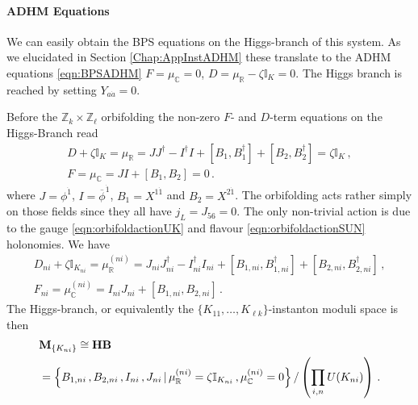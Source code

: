 \documentclass[main.tex]{subfiles}
\begin{document}
\paragraph{ADHM Equations}
We can easily obtain the BPS equations on the Higgs-branch of this system. As we elucidated in Section \ref{Chap:AppInstADHM} these translate to the ADHM equations \eqref{eqn:BPSADHM} $F=\mu_{\mathbb{C}}=0$, $D=\mu_{\mathbb{R}}-\zeta\mathbb{I}_K=0$. The Higgs branch is reached by setting $Y_{a\dot a}=0$.

Before the $\mathbb{Z}_k\times\mathbb{Z}_{\ell}$ orbifolding the non-zero $F$- and $D$-term equations on the Higgs-Branch read
\begin{gather}
D+\zeta\mathbb{I}_K=\mu_{\mathbb{R}}=JJ^{\dagger}-I^{\dagger}I+[B_1,B_1^{\dagger}]+[B_2,B_2^{\dagger}]=\zeta\mathbb{I}_{K}\,,\\
F=\mu_{\mathbb{C}}=JI+[B_1,B_2]=0\,.
\end{gather}
where $J=\phi^{\dot1}$, $I=\overline{\phi}^{\dot1}$, $B_1=X^{1\dot1}$ and $B_2=X^{2\dot1}$. The orbifolding acts rather simply on those fields since they all have $j_L=J_{56}=0$. The only non-trivial action is due to the gauge \eqref{eqn:orbifoldactionUK} and flavour \eqref{eqn:orbifoldactionSUN} holonomies. We have
\begin{gather}
D_{ni}+\zeta\mathbb{I}_{K_{ni}}=\mu^{(ni)}_{\mathbb{R}}=J_{ni}J^{\dagger}_{ni}-I^{\dagger}_{ni}I_{ni}+[B_{1,ni},B^{\dagger}_{1,ni}]+[B_{2,ni},B^{\dagger}_{2,ni}]\,,\\
F_{ni}=\mu^{(ni)}_{\mathbb{C}}=I_{ni}J_{ni}+[B_{1,ni},B_{2,ni}]\,.
\end{gather}
The Higgs-branch, or equivalently the $\{K_{11},\dots,K_{\ell k}\}$-instanton moduli space is then
\begin{equation}\label{eqn:ADHMSigmaModel1}
\begin{aligned}
&\mathbf{M}_{\{K_{ni}\}}\cong\mathbf{HB}\\
&=\left\{B_{1,ni}\,,B_{2,ni}\,,I_{ni}\,,J_{ni}\,|\,\mu^{(ni)}_{\mathbb{R}}=\zeta\mathbb{I}_{K_{ni}}\,,\mu^{(ni)}_{\mathbb{C}}=0\right\}/\left(\prod_{i,n}U(K_{ni})\right)\,.
\end{aligned}
\end{equation}
\end{document}
